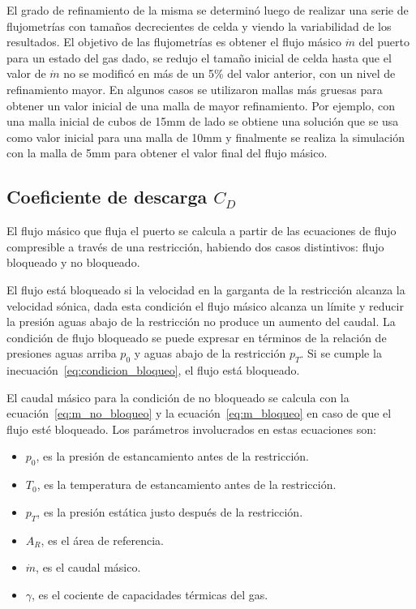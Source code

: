 El grado de refinamiento de la misma se determinó luego de realizar una serie de
flujometrías con tamaños decrecientes de celda y viendo la variabilidad de los
resultados.
%
El objetivo de las flujometrías es obtener el flujo másico $\dot{m}$ del puerto
para un estado del gas dado, se redujo el tamaño inicial de celda hasta que el
valor de $\dot{m}$ no se modificó en más de un 5\% del valor anterior, con un
nivel de refinamiento mayor.
%
En algunos casos se utilizaron mallas más gruesas para obtener un valor inicial
de una malla de mayor refinamiento.
%
Por ejemplo, con una malla inicial de cubos de 15mm de lado se obtiene una
solución que se usa como valor inicial para una malla de 10mm y finalmente se
realiza la simulación con la malla de 5mm para obtener el valor final del flujo
másico.

\subsection{Coeficiente de descarga $C_{D}$}\label{sec:cap2_cd}

El flujo másico que fluja el puerto se calcula a partir de las ecuaciones de
flujo compresible a través de una restricción, habiendo dos casos distintivos:
flujo bloqueado y no bloqueado.

El flujo está bloqueado si la velocidad en la garganta de la restricción alcanza
la velocidad sónica, dada esta condición el flujo másico alcanza un límite y
reducir la presión aguas abajo de la restricción no produce un aumento del caudal.
%
La condición de flujo bloqueado se puede expresar en términos de la relación de
presiones aguas arriba $p_{0}$ y aguas abajo de la restricción $p_{T}$.
%
Si se cumple la inecuación~\ref{eq:condicion_bloqueo}, el flujo está bloqueado.

El caudal másico para la condición de no bloqueado se calcula con la
ecuación~\ref{eq:m_no_bloqueo} y la ecuación~\ref{eq:m_bloqueo} en caso de que
el flujo esté bloqueado.
%
Los parámetros involucrados en estas ecuaciones son:
\begin{itemize}
    \item $p_0$, es la presión de estancamiento antes de la restricción.
    \item $T_0$, es la temperatura de estancamiento antes de la restricción.
    \item $p_T$, es la presión estática justo después de la restricción.
    \item $A_R$, es el área de referencia.
    \item $\dot{m}$, es el caudal másico.
    \item $\gamma$, es el cociente de capacidades térmicas del gas.
\end{itemize}

